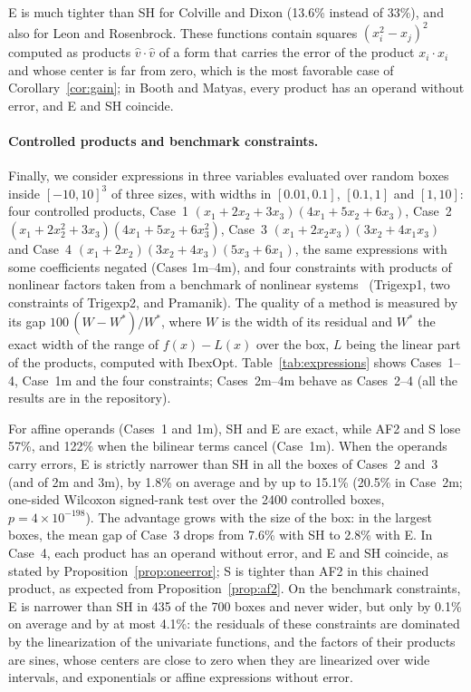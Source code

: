 \documentclass[10pt]{article}
\theoremstyle{definition}
\begin{document}
E is much tighter than SH for Colville and Dixon (13.6\% instead of 33\%), and also for Leon and Rosenbrock. These functions contain squares $(x_i^2-x_j)^2$ computed as products $\hat v\cdot\hat v$ of a form that carries the error of the product $x_i\cdot x_i$ and whose center is far from zero, which is the most favorable case of Corollary~\ref{cor:gain}; in Booth and Matyas, every product has an operand without error, and E and SH coincide.

\paragraph{Controlled products and benchmark constraints.} Finally, we consider expressions in three variables evaluated over random boxes inside $[-10,10]^3$ of three sizes, with widths in $[0.01,0.1]$, $[0.1,1]$ and $[1,10]$: four controlled products, Case~1 $(x_1+2x_2+3x_3)(4x_1+5x_2+6x_3)$, Case~2 $(x_1+2x_2^2+3x_3)(4x_1+5x_2+6x_3^2)$, Case~3 $(x_1+2x_2x_3)(3x_2+4x_1x_3)$ and Case~4 $(x_1+2x_2)(3x_2+4x_3)(5x_3+6x_1)$, the same expressions with some coefficients negated (Cases 1m--4m), and four constraints with products of nonlinear factors taken from a benchmark of nonlinear systems~\cite{coprin} (Trigexp1, two constraints of Trigexp2, and Pramanik). The quality of a method is measured by its gap $100\,(W-W^*)/W^*$, where $W$ is the width of its residual and $W^*$ the exact width of the range of $f(x)-L(x)$ over the box, $L$ being the linear part of the products, computed with IbexOpt. Table~\ref{tab:expressions} shows Cases~1--4, Case~1m and the four constraints; Cases~2m--4m behave as Cases~2--4 (all the results are in the repository).



For affine operands (Cases~1 and 1m), SH and E are exact, while AF2 and S lose 57\%, and 122\% when the bilinear terms cancel (Case~1m). When the operands carry errors, E is strictly narrower than SH in all the boxes of Cases~2 and~3 (and of 2m and 3m), by 1.8\% on average and by up to 15.1\% (20.5\% in Case~2m; one-sided Wilcoxon signed-rank test over the 2400 controlled boxes, $p=4\times10^{-198}$). The advantage grows with the size of the box: in the largest boxes, the mean gap of Case~3 drops from 7.6\% with SH to 2.8\% with E. In Case~4, each product has an operand without error, and E and SH coincide, as stated by Proposition~\ref{prop:oneerror}; S is tighter than AF2 in this chained product, as expected from Proposition~\ref{prop:af2}. On the benchmark constraints, E is narrower than SH in 435 of the 700 boxes and never wider, but only by 0.1\% on average and by at most 4.1\%: the residuals of these constraints are dominated by the linearization of the univariate functions, and the factors of their products are sines, whose centers are close to zero when they are linearized over wide intervals, and exponentials or affine expressions without error.
\end{document}
